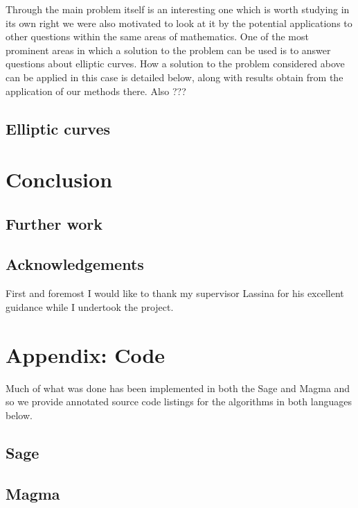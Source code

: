 \documentclass[a4paper,abstracton]{scrreprt}
\theoremstyle{definition}
\begin{document}
Through the main problem itself is an interesting one which is worth studying in its own right we were also motivated to look at it by the potential applications to other questions within the same areas of mathematics.
One of the most prominent areas in which a solution to the problem can be used is to answer questions about elliptic curves.
How a solution to the problem considered above can be applied in this case is detailed below, along with results obtain from the application of our methods there.
Also ???

\section{Elliptic curves}
\label{sec:ell}

\chapter{Conclusion}


\section{Further work}


\section{Acknowledgements}
First and foremost I would like to thank my supervisor Lassina for his excellent guidance while I undertook the project.

\chapter{Appendix: Code}

Much of what was done has been implemented in both the Sage and Magma and so we provide annotated source code listings for the algorithms in both languages below.
 
\section{Sage}


\section{Magma}



\nocite{*}


\end{document}
